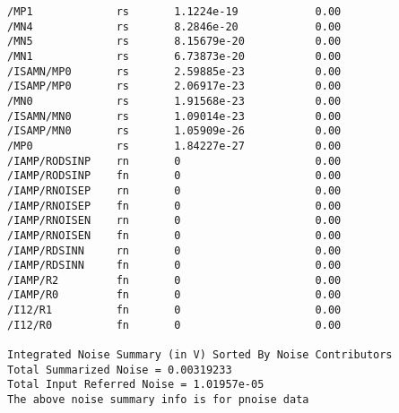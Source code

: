 {\begin{verbatim}
/MP1             rs       1.1224e-19            0.00      
/MN4             rs       8.2846e-20            0.00      
/MN5             rs       8.15679e-20           0.00      
/MN1             rs       6.73873e-20           0.00      
/ISAMN/MP0       rs       2.59885e-23           0.00      
/ISAMP/MP0       rs       2.06917e-23           0.00      
/MN0             rs       1.91568e-23           0.00      
/ISAMN/MN0       rs       1.09014e-23           0.00      
/ISAMP/MN0       rs       1.05909e-26           0.00      
/MP0             rs       1.84227e-27           0.00      
/IAMP/RODSINP    rn       0                     0.00      
/IAMP/RODSINP    fn       0                     0.00      
/IAMP/RNOISEP    rn       0                     0.00      
/IAMP/RNOISEP    fn       0                     0.00      
/IAMP/RNOISEN    rn       0                     0.00      
/IAMP/RNOISEN    fn       0                     0.00      
/IAMP/RDSINN     rn       0                     0.00      
/IAMP/RDSINN     fn       0                     0.00      
/IAMP/R2         fn       0                     0.00      
/IAMP/R0         fn       0                     0.00      
/I12/R1          fn       0                     0.00      
/I12/R0          fn       0                     0.00      

Integrated Noise Summary (in V) Sorted By Noise Contributors
Total Summarized Noise = 0.00319233
Total Input Referred Noise = 1.01957e-05
The above noise summary info is for pnoise data
\end{verbatim}
}
